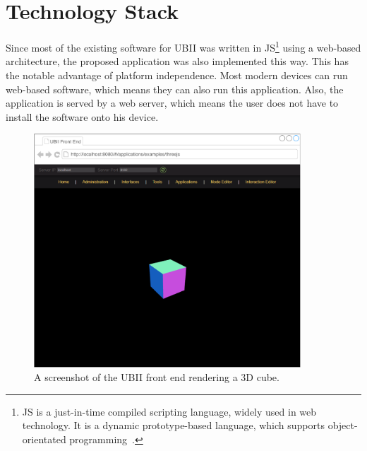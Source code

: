 \section{Technology Stack}\label{section:technology-stack}

Since most of the existing software for \ac{UBII} was written in \acf{JS}\footnote{\ac{JS} is a just-in-time compiled scripting language, widely used in web technology. It is a dynamic prototype-based language, which supports object-orientated programming~\cite[43, 47]{ECMAInternational.2018}.} using a web-based architecture, the proposed application was also implemented this way. This has the notable advantage of platform independence. Most modern devices can run web-based software, which means they can also run this application. Also, the application is served by a web server, which means the user does not have to install the software onto his device.

\begin{figure}[htpb]
  \centering
  \includegraphics[width=10cm]{figures/implementation/ubii_front_end.pdf}
  \caption[Screenshot of the UBII front end]{A screenshot of the UBII front end rendering a \ac{3D} cube.}\label{fig:ubii-front-end}
\end{figure}

